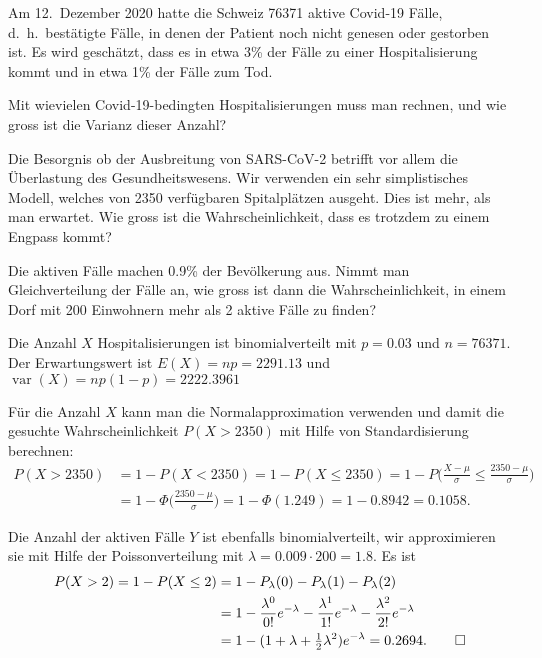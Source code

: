Am 12.~Dezember 2020 hatte die Schweiz 76371 aktive Covid-19 Fälle,
d.~h.~bestätigte Fälle, in denen der Patient noch nicht genesen oder
gestorben ist.
Es wird geschätzt, dass es in etwa 3\% der Fälle zu einer Hospitalisierung
kommt und in etwa 1\% der Fälle zum Tod.
\begin{teilaufgaben}
\item
Mit wievielen Covid-19-bedingten Hospitalisierungen muss man rechnen, und
wie gross ist die Varianz dieser Anzahl?
\item
Die Besorgnis ob der Ausbreitung von SARS-CoV-2 betrifft vor allem die
Überlastung des Gesundheitswesens.
Wir verwenden ein sehr simplistisches Modell, welches von 2350 
verfügbaren Spitalplätzen ausgeht.
Dies ist mehr, als man erwartet.
Wie gross ist die Wahrscheinlichkeit, dass es trotzdem zu einem Engpass kommt?
\item
Die aktiven Fälle machen 0.9\% der Bevölkerung aus.
Nimmt man Gleichverteilung der Fälle an, wie gross ist dann die
Wahrscheinlichkeit, in einem Dorf mit 200 Einwohnern mehr als 2 
aktive Fälle zu finden?
\end{teilaufgaben}


\begin{loesung}
\begin{teilaufgaben}
\item
Die Anzahl $X$ Hospitalisierungen ist binomialverteilt mit $p=0.03$ und
$n=76371$.
Der Erwartungswert ist $E(X)=np = 2291.13$ und
$\operatorname{var}(X)=np(1-p)=2222.3961$
\item
Für die Anzahl $X$ kann man die Normalapproximation verwenden und damit
die gesuchte Wahrscheinlichkeit $P(X>2350)$ mit Hilfe von Standardisierung
berechnen:
\begin{align*}
P(X>2350)
&=
1-P(X<2350)
=
1-P(X\le 2350)
=
1-P\biggl(\frac{X-\mu}{\sigma}\le \frac{2350-\mu}{\sigma}\biggr)
\\
&=
1-\Phi\biggl(\frac{2350-\mu}{\sigma}\biggr)
=
1-\Phi(1.249)
=
1-0.8942
=
0.1058.
\end{align*}
\item
Die Anzahl der aktiven Fälle $Y$ ist ebenfalls binomialverteilt,
wir approximieren sie mit Hilfe der Poissonverteilung mit
$\lambda = 0.009\cdot 200 = 1.8$.
Es ist
\begin{align*}
P(X > 2)
=
1-P(X\le 2)
&=
1-P_{\lambda}(0)-P_{\lambda}(1)-P_{\lambda}(2)
\\
&=
1-
\frac{\lambda^0}{0!}e^{-\lambda}
-
\frac{\lambda^1}{1!}e^{-\lambda}
-
\frac{\lambda^2}{2!}e^{-\lambda}
\\
&=
1-(1+\lambda+{\textstyle\frac12}\lambda^2)e^{-\lambda}
=
0.2694.
\qedhere
\end{align*}
\end{teilaufgaben}
\end{loesung}

